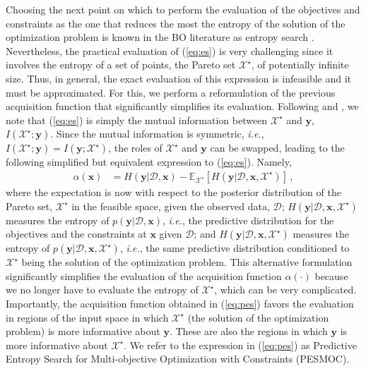 \documentclass[review,preprint,12pt]{elsarticle}
\begin{document}
Choosing the next point on which to perform the evaluation of the objectives and constraints as the one that 
reduces the most the entropy of the solution of the optimization problem is known in the BO literature as entropy 
search \citep{hennig2012entropy,villemonteix2009informational}. Nevertheless, the practical evaluation of (\ref{eq:es}) 
is very challenging since it involves the entropy of a set of points, the Pareto set $\mathcal{X}^\star$, of potentially 
infinite size.  Thus, in general, the exact evaluation of this expression is infeasible and it must be approximated.
For this, we perform a reformulation of the previous acquisition function that significantly simplifies its evaluation. 
Following \cite{houlsby2012collaborative} and \cite{hernandez2014predictive}, we note that
(\ref{eq:es}) is simply the mutual information between $\mathcal{X}^{\star}$ and $\textbf{y}$, 
$I(\mathcal{X}^{\star};\mathbf{y})$. Since the 
mutual information is symmetric, \emph{i.e.}, $I(\mathcal{X}^{\star};\mathbf{y})=I(\mathbf{y};\mathcal{X}^{\star})$, the 
roles of $\mathcal{X}^{\star}$ and $\textbf{y}$ can be swapped, leading to the following simplified but equivalent 
expression to (\ref{eq:es}). Namely,
\begin{align}
\alpha(\mathbf{x}) & = 
H(\textbf{y}|\mathcal{D},\textbf{x}) - \mathbb{E}_{\mathcal{X}^{\star}} [H(\textbf{y}|\mathcal{D},\textbf{x},\mathcal{X}^{\star})]
\,, \label{eq:pes}
\end{align}
where the expectation is now with respect to the posterior distribution of
the Pareto set, $\mathcal{X}^{\star}$ in the feasible space, given the observed 
data, $\mathcal{D}$; $H(\textbf{y}|\mathcal{D},\textbf{x},\mathcal{X}^{\star})$ measures the entropy of 
$p(\mathbf{y}|\mathcal{D}, \textbf{x})$, \emph{i.e.}, the predictive distribution 
for the objectives and the constraints at $\mathbf{x}$ given $\mathcal{D}$;
and $H(\textbf{y}|\mathcal{D},\textbf{x},\mathcal{X}^{\star})$ measures the entropy of 
$p(\mathbf{y}|\mathcal{D}, \textbf{x}, \mathcal{X}^{\star} )$, \emph{i.e.}, the same predictive 
distribution  conditioned to $\mathcal{X}^{\star}$ being the solution of the optimization problem. 
This alternative formulation significantly simplifies the evaluation
of the acquisition function $\alpha(\cdot)$ because we no longer have
to evaluate the entropy of $\mathcal{X}^\star$, which can be very complicated. 
Importantly, the acquisition function obtained in (\ref{eq:pes}) favors the evaluation in regions of 
the input space in which $\mathcal{X}^\star$ (the solution of the optimization problem) 
is more informative about $\mathbf{y}$. These are also the regions in which $\mathbf{y}$ is more 
informative about $\mathcal{X}^\star$. We refer to the expression in (\ref{eq:pes}) as Predictive 
Entropy Search for Multi-objective Optimization with Constraints (PESMOC). 
\end{document}
